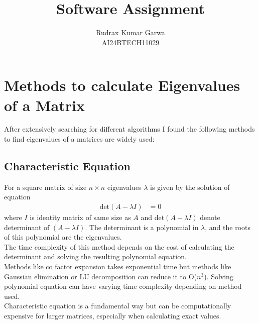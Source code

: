 \documentclass{article}
\title{Software Assignment}
\author{Rudrax Kumar Garwa\\AI24BTECH11029}
\begin{document}
                               

\maketitle                        

\section*{Methods to calculate Eigenvalues of a Matrix}
After extensively searching for different algorithms I found the following methods to find eigenvalues of a matrices are widely used:
\subsection*{Characteristic Equation}
For a square matrix of size $n{\times}n$ eigenvalues $\lambda$ is given by the solution of equation
\begin{align*}
    \text{det}(A-{\lambda}I)&=0
\end{align*}
where $I$ is identity matrix of same size as $A$ and det$(A-{\lambda}I)$ denote determinant of $(A-{\lambda}I)$. The determinant is a polynomial in $\lambda$, and the roots of this polynomial are the eigenvalues.
\\The time complexity of this method depends on the cost of calculating the determinant and solving the resulting polynomial equation.
\\Methods like co factor expansion takes exponential time but methods like Gaussian elimination or LU decomposition can reduce it to O($n^3$). Solving polynomial equation can have varying time complexity depending on method used.
\\Characteristic equation is a fundamental way but can be computationally expensive for larger matrices, especially when calculating exact values.
\end{document}
